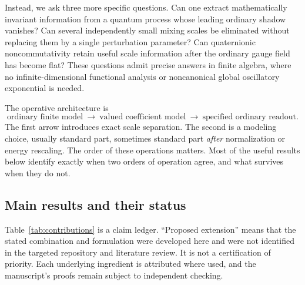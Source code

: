 \documentclass[11pt,oneside]{article}
\numberwithin{equation}{section}
\theoremstyle{plain}
\theoremstyle{definition}
\theoremstyle{remark}
\begin{document}
Instead, we ask three more specific questions. Can one extract mathematically invariant information from a quantum process whose leading ordinary shadow vanishes? Can several independently small mixing scales be eliminated without replacing them by a single perturbation parameter? Can quaternionic noncommutativity retain useful scale information after the ordinary gauge field has become flat? These questions admit precise answers in finite algebra, where no infinite-dimensional functional analysis or noncanonical global oscillatory exponential is needed.

The operative architecture is
\begin{equation}\label{eq:architecture}
\text{ordinary finite model}
\ \longrightarrow\ \text{valued coefficient model}
\ \longrightarrow\ \text{specified ordinary readout}.
\end{equation}
The first arrow introduces exact scale separation. The second is a modeling choice, usually standard part, sometimes standard part \emph{after} normalization or energy rescaling. The order of these operations matters. Most of the useful results below identify exactly when two orders of operation agree, and what survives when they do not.

\subsection{Main results and their status}
Table~\ref{tab:contributions} is a claim ledger. ``Proposed extension'' means that the stated combination and formulation were developed here and were not identified in the targeted repository and literature review. It is not a certification of priority. Each underlying ingredient is attributed where used, and the manuscript's proofs remain subject to independent checking.
\end{document}
